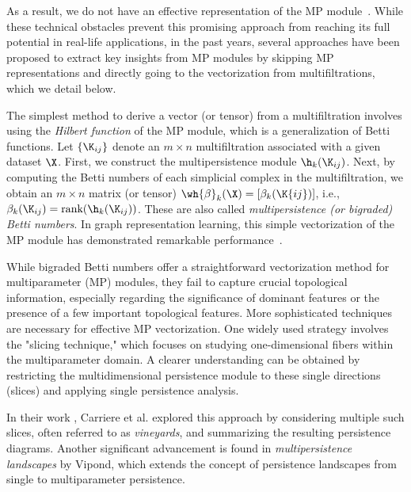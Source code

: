 As a result, we do not have an effective representation of the MP module~\cite{botnan2022introduction}. While these technical obstacles prevent this promising approach from reaching its full potential in real-life applications, in the past years, several approaches have been proposed to extract key insights from MP modules by skipping MP representations and directly going to the vectorization from multifiltrations, which we detail below. 



The simplest method to derive a vector (or tensor) from a multifiltration involves using the \textit{Hilbert function} of the MP module, which is a generalization of Betti functions. Let $\{\K_{ij}\}$ denote an $m \times n$ multifiltration associated with a given dataset $\X$. First, we construct the multipersistence module ${\h_k(\K_{ij})}$. Next, by computing the Betti numbers of each simplicial complex in the multifiltration, we obtain an $m \times n$ matrix (or tensor) $\wh{\beta}_k(\X) = [\beta_k(\K{ij})]$, i.e., $\beta_k(\K_{ij}) = \text{rank}(\h_k(\K_{ij}))$. These are also called \textit{multipersistence (or bigraded) Betti numbers}. In graph representation learning, this simple vectorization of the MP module has demonstrated remarkable performance~\cite{loiseaux2024stable,chen2024emp,xin2023gril}.



While bigraded Betti numbers offer a straightforward vectorization method for multiparameter (MP) modules, they fail to capture crucial topological information, especially regarding the significance of dominant features or the presence of a few important topological features. More sophisticated techniques are necessary for effective MP vectorization. One widely used strategy involves the "slicing technique," which focuses on studying one-dimensional fibers within the multiparameter domain. A clearer understanding can be obtained by restricting the multidimensional persistence module to these single directions (slices) and applying single persistence analysis. 

In their work \cite{carriere2020multiparameter}, Carriere et al. explored this approach by considering multiple such slices, often referred to as {\em vineyards}, and summarizing the resulting persistence diagrams. Another significant advancement is found in {\em multipersistence landscapes} \cite{vipond2020multiparameter} by Vipond, which extends the concept of persistence landscapes \cite{bubenik2015statistical} from single to multiparameter persistence. 

